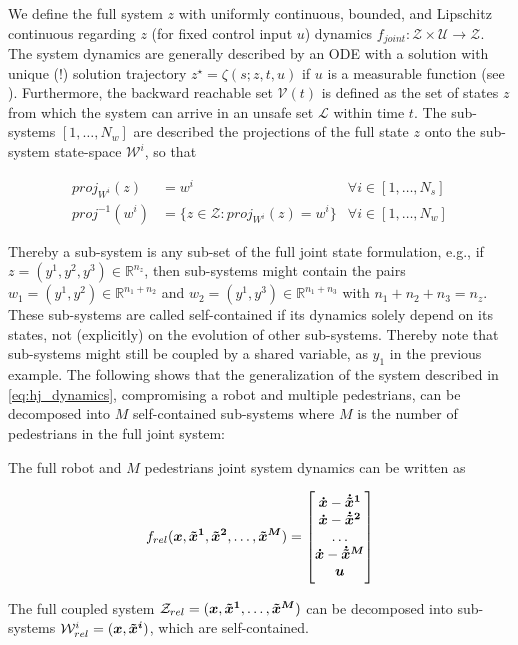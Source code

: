 We define the full system $z$ with uniformly continuous, bounded, and Lipschitz continuous regarding $z$ (for fixed control input $u$) dynamics $f_{joint}: \mathcal{Z} \times \mathcal{U} \rightarrow \mathcal{Z}$. The system dynamics are generally described by an \ac{ODE} with a solution with unique (!) solution trajectory $z^{\star} = \zeta(s; z, t, u)$ if $u$ is a measurable function (see \cite{Chen2016a}\cite{Varaiya1967}). Furthermore, the backward reachable set $\mathcal{V}(t)$ is defined as the set of states $z$ from which the system can arrive in an unsafe set $\mathcal{L}$ within time $t$. The sub-systems $[1, \hdots, N_w]$ are described the projections of the full state $z$ onto the sub-system state-space $\mathcal{W}^i$, so that

\begin{align}
proj_{W^i}(z) &= w^i & \forall i \in [1, \hdots, N_s] \\
proj^{-1}(w^i) &= \{z \in \mathcal{Z}: proj_{W^i}(z) = w^i \} & \forall i \in [1, \hdots, N_w]
\label{eq:hj_projection}
\end{align}

Thereby a sub-system is any sub-set of the full joint state formulation, e.g., if $z = (y^1, y^2, y^3) \in \mathbb{R}^{n_z}$, then sub-systems might contain the pairs $w_1 = (y^1, y^2) \in \mathbb{R}^{n_1 + n_2}$ and $w_2 = (y^1, y^3) \in \mathbb{R}^{n_1 + n_3}$ with $n_1 + n_2 + n_3 = n_z$. These sub-systems are called self-contained if its dynamics solely depend on its states, not (explicitly) on the evolution of other sub-systems. Thereby note that sub-systems might still be coupled by a shared variable, as $y_1$ in the previous example.
\newline
The following shows that the generalization of the system described in \ref{eq:hj_dynamics}, compromising a robot and multiple pedestrians, can be decomposed into $M$ self-contained sub-systems where $M$ is the number of pedestrians in the full joint system: \\

\begin{corollary}
The full robot and $M$ pedestrians joint system dynamics can be written as

\begin{equation}
\frel(\x, \xped[1], \xped[2], \hdots, \xped[M]) =
\begin{bmatrix}
\dx - \dxped[1] \\
\dx - \dxped[2] \\
\hdots \\
\dx - \dxped[M] \\
\u
\end{bmatrix}
\label{eq:hj_dynamics_full}
\end{equation}

The full coupled system $\mathcal{Z}_{rel} = (\x, \xped[1], \hdots, \xped[M])$ can be decomposed into sub-systems $\mathcal{W}_{rel}^i = (\x, \xped[i])$, which are self-contained.
\label{co:hj_sub_systems}
\end{corollary}

